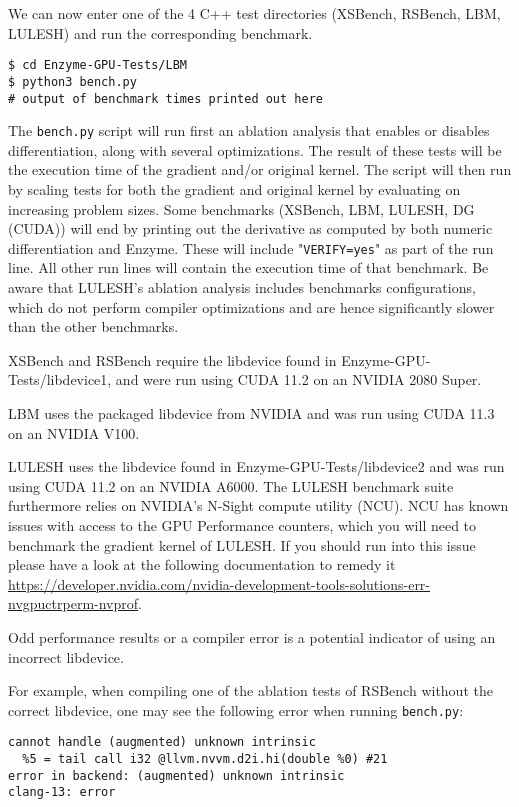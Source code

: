 We can now enter one of the 4 C++ test directories (XSBench, RSBench, LBM, LULESH) and run the corresponding benchmark.

\begin{verbatim}
$ cd Enzyme-GPU-Tests/LBM
$ python3 bench.py
# output of benchmark times printed out here
\end{verbatim}

The \verb|bench.py| script will run first an ablation analysis that enables or disables differentiation, along with several optimizations. The result of these tests will be the execution time of the gradient and/or original kernel. The script will then run by scaling tests for both the gradient and original kernel by evaluating on increasing problem sizes. Some benchmarks (XSBench, LBM, LULESH, DG (CUDA)) will end by printing out the derivative as computed by both numeric differentiation and Enzyme. These will include "\verb|VERIFY=yes|" as part of the run line. All other run lines will contain the execution time of that benchmark. Be aware that LULESH's ablation analysis includes benchmarks configurations, which do not perform compiler optimizations and are hence significantly slower than the other benchmarks.

XSBench and RSBench require the libdevice found in Enzyme-GPU-Tests/libdevice1, and were run using CUDA 11.2 on an NVIDIA 2080 Super.

LBM uses the packaged libdevice from NVIDIA and was run using CUDA 11.3 on an NVIDIA V100.

LULESH uses the libdevice found in Enzyme-GPU-Tests/libdevice2 and was run using CUDA 11.2 on an NVIDIA A6000. The LULESH benchmark suite furthermore relies on NVIDIA's N-Sight compute utility (NCU). NCU has known issues with access to the GPU Performance counters, which you will need to benchmark the gradient kernel of LULESH. If you should run into this issue please have a look at the following documentation to remedy it \url{https://developer.nvidia.com/nvidia-development-tools-solutions-err-nvgpuctrperm-nvprof}.

Odd performance results or a compiler error is a potential indicator of using an incorrect libdevice.

For example, when compiling one of the ablation tests of RSBench without the correct libdevice, one may see the following error when running \verb|bench.py|:
\begin{verbatim}
cannot handle (augmented) unknown intrinsic
  %5 = tail call i32 @llvm.nvvm.d2i.hi(double %0) #21
error in backend: (augmented) unknown intrinsic
clang-13: error
\end{verbatim}

